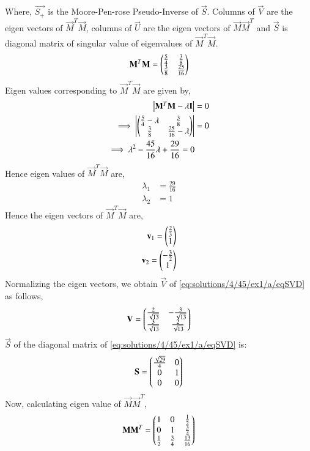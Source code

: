 Where, $\Vec{S_+}$ is the Moore-Pen-rose Pseudo-Inverse of $\Vec{S}$. Columns of $\vec{V}$ are the eigen vectors of $\vec{M}^T\vec{M}$, columns of $\vec{U}$ are the eigen vectors of $\vec{M}\vec{M}^T$ and $\vec{S}$ is diagonal matrix of singular value of eigenvalues of $\vec{M}^T\vec{M}$.
\begin{align}
\mathbf{M}^T\mathbf{M}=\begin{pmatrix}\frac{5}{4}&\frac{3}{8}\\\frac{3}{8}&\frac{25}{16}\end{pmatrix}\label{eq:solutions/4/45/ex1/a/eqMTM}
\end{align}
Eigen values corresponding to $\Vec{M}^T\Vec{M}$ are given by,
\begin{align}
\begin{vmatrix}\mathbf{M}^T\mathbf{M}-\lambda\mathbf{I}\end{vmatrix} &= 0\\
\implies\begin{vmatrix}\begin{pmatrix}\frac{5}{4}-\lambda&\frac{3}{8}\\\frac{3}{8}&\frac{25}{16}-\lambda\end{pmatrix}\end{vmatrix} &=0\\
\implies \lambda^2-\frac{45}{16}\lambda+\frac{29}{16}=0
\end{align}
Hence eigen values of $\vec{M}^T\vec{M}$ are,
\begin{align}
\lambda_1 &= \frac{29}{16}\\
\lambda_2 &= 1
\end{align}
Hence the eigen vectors of $\vec{M}^T\vec{M}$ are,
\begin{align}
\mathbf{v}_1=\begin{pmatrix}\frac{2}{3}\\1\end{pmatrix}\\
\mathbf{v}_2=\begin{pmatrix}-\frac{3}{2}\\1\end{pmatrix}
\end{align}
Normalizing the eigen vectors, we obtain $\vec{V}$ of \eqref{eq:solutions/4/45/ex1/a/eqSVD} as follows,
\begin{align}
\mathbf{V}=\begin{pmatrix}\frac{2}{\sqrt{13}}&-\frac{3}{\sqrt{13}}\\ \frac{3}{\sqrt{13}}&\frac{2}{\sqrt{13}}\end{pmatrix}\label{eq:solutions/4/45/ex1/a/eqV}
\end{align}
$\vec{S}$ of the diagonal matrix of \eqref{eq:solutions/4/45/ex1/a/eqSVD} is:
\begin{align}
\mathbf{S}=\begin{pmatrix}\frac{\sqrt{29}}{4}&0\\0&1\\0&0\end{pmatrix}\label{eq:solutions/4/45/ex1/a/eqS}
\end{align}
Now, calculating eigen value of $\vec{M}\vec{M}^T$,
\begin{align}
    \Vec{M}\Vec{M}^T=\myvec{1&0&\frac{1}{2}\\0&1&\frac{3}{4}\\\frac{1}{2}&\frac{3}{4}&\frac{13}{16}}
\end{align}
